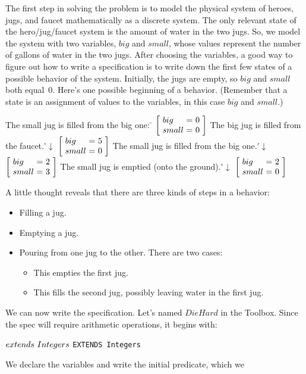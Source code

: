 \documentclass[fleqn,leqno]{article}
\makeatletter
\newcommand{\dhstate}[2]{\left[\!\begin{array}{l@{\,\,}c@{\,\,}c}
                        big & = & #1 \\ small & = & #2
                        \end{array}\!\right]}
\makeatother
\begin{document}
The first step in solving the problem is to model the physical system
of heroes, jugs, and faucet mathematically as a discrete system.
%
The only relevant state of the hero/jug/faucet system is the amount of
water in the two jugs.  So, we model the system with two variables,
$big$ and $small$, whose values represent the number of gallons of
water in the two jugs.  After choosing the variables, a good way to
figure out how to write a specification is to write down the first few
states of a possible behavior of the system.  Initially, the jugs are
empty, so $big$ and $small$ both equal~0.  Here's one possible
beginning of a behavior.  (Remember that a state is an assignment of
values to the variables, in this case $big$ and $small$.)
\begin{display}
\begin{tabbing}
The small jug is filled from the big one: \= \kill
%
\>
$\dhstate{0}{0}$
%
\>The big jug is filled from the faucet.\'$\downarrow$
%
\>
$\dhstate{5}{0}$ 
%
%
\>The small jug is filled from the big one.\'$\downarrow$
%
\>
$\dhstate{2}{3}$
%
\>The small jug is emptied (onto the ground).\'$\downarrow$
%
\> $\dhstate{2}{0}$
\end{tabbing}
\end{display}
A little thought reveals that there are three kinds of steps in a
behavior:
\begin{itemize}
\item Filling a jug.
\item Emptying a jug.
\item Pouring from one jug to the other.  There are two cases:
\begin{itemize}
\item This empties the first jug.
\item This fills the second jug, possibly leaving water
      in the first jug.
\end{itemize}
\end{itemize}
We can now write the specification.  Let's  named $DieHard$ in the Toolbox.  Since the spec
will require arithmetic operations, it begins with:
\begin{display}
\begin{twocols}%
$\EXTENDS\ Integers$
\midcol
\verb|EXTENDS Integers|
\end{twocols}
\end{display}
We declare the variables and write the initial predicate, which we
\end{document}
